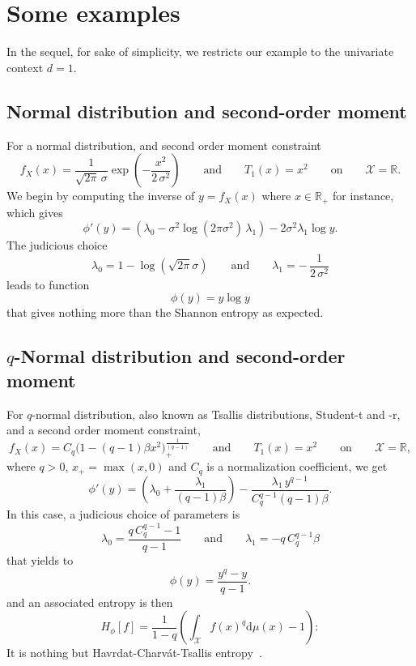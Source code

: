 \documentclass[english,sort&compress]{elsarticle}
\theoremstyle{definition}
\theoremstyle{plain}
\theoremstyle{plain}
\def\dmu{\mathrm{d}\mu}
\def\Rset{\mathbb{R}}
\def\X{\mathcal{X}}
\begin{document}

\section{Some examples}
\label{sec:Examples}

In  the  sequel,  for sake  of  simplicity,  we  restricts  our example  to  the
univariate context $d = 1$.


\subsection{Normal distribution and second-order moment}
\label{subsec:NormalSecondOrder}

For a normal distribution, and second order moment constraint 
%
\[
f_X(x)  = \frac{1}{\sqrt{2\pi} \,\sigma}  \exp\left( -\frac{x^2}{2  \, \sigma^2}
\right)  \qquad \mbox{and}  \qquad T_1(x)  = x^2  \qquad \mbox{on}  \qquad  \X =
\Rset.
\]
%
We begin  by computing the  inverse of  $y = f_X(x)$  where $x \in  \Rset_+$ for
instance, which gives
%
\[
\phi'(y) = \left( \lambda_0 - \sigma^2 \log(2 \pi \sigma^2) \, \lambda_1 \right)
- 2 \sigma^2 \lambda_1 \log y.
\]
%
The judicious choice
%
\[
\lambda_0 = 1 - \log( \sqrt{2\pi}  \sigma ) \qquad \mbox{and} \qquad \lambda_1 =
- \, \frac{1}{2 \, \sigma^2}
\]
%
leads to function
%
\[
\phi(y) = y \log y
\]
%
that gives nothing more than the Shannon entropy as expected.



\subsection{$q$-Normal distribution and second-order moment}
\label{subsec:qNormalSecondOrder}

For $q$-normal distribution, also  known as Tsallis distributions, Student-t and
-r, and a second order moment constraint,
%
\[
f_X(x)  = C_q  \Big( 1  - (q-1)  \beta x^2  \Big)_{\!+}^{\frac{1}{(q-1)}} \qquad
\mbox{and} \qquad T_1(x) = x^2 \qquad \mbox{on} \qquad \X = \Rset,
\]
%
where $q  > 0$, $x_+ = \max(x,0)$  and $C_q$ is a  normalization coefficient, we
get
%
\[
\phi'(y)  =   \left(  \lambda_0   +  \frac{\lambda_1}{(q-1)  \beta}   \right)  -
\frac{\lambda_1 \, y^{q-1}}{C_q^{q-1} (q-1) \beta}.
\]
%
In this case, a judicious choice of parameters is
%
\[
\lambda_0 = \frac{q \, C_q^{q-1}  - 1}{q-1} \qquad \mbox{and} \qquad \lambda_1 =
-q \, C_q^{q-1} \beta
\]
%
that yields to 
%
\[
\phi(y) = \frac{y^q-y}{q-1}.
\]
%
and an associated entropy is then 
%
\[
H_\phi[f] = \frac{1}{1-q} \left( \int_\X f(x)^q \dmu(x) - 1 \right):
\]
%
It  is  nothing  but  Havrdat-Charv\'at-Tsallis  entropy~\cite{HavCha67,  Dar70,
  Tsa88, CosHer03}.
\end{document}

